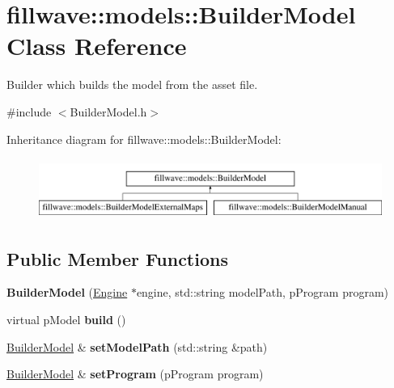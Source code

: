 \hypertarget{classfillwave_1_1models_1_1BuilderModel}{}\section{fillwave\+:\+:models\+:\+:Builder\+Model Class Reference}
\label{classfillwave_1_1models_1_1BuilderModel}


Builder which builds the model from the asset file.  




{\ttfamily \#include $<$Builder\+Model.\+h$>$}

Inheritance diagram for fillwave\+:\+:models\+:\+:Builder\+Model\+:\begin{figure}[H]
\begin{center}
\leavevmode
\includegraphics[height=2.000000cm]{classfillwave_1_1models_1_1BuilderModel}
\end{center}
\end{figure}
\subsection*{Public Member Functions}
\begin{DoxyCompactItemize}
\item 
\hypertarget{classfillwave_1_1models_1_1BuilderModel_ae7ed2ae0486af650bad110f7f9d41b3e}{}{\bfseries Builder\+Model} (\hyperlink{classfillwave_1_1Engine}{Engine} $\ast$engine, std\+::string model\+Path, p\+Program program)\label{classfillwave_1_1models_1_1BuilderModel_ae7ed2ae0486af650bad110f7f9d41b3e}

\item 
\hypertarget{classfillwave_1_1models_1_1BuilderModel_ae1dfaa700dda4f97021a543139194408}{}virtual p\+Model {\bfseries build} ()\label{classfillwave_1_1models_1_1BuilderModel_ae1dfaa700dda4f97021a543139194408}

\item 
\hypertarget{classfillwave_1_1models_1_1BuilderModel_a6f79f1bfa7fa74173e0414562fe9459e}{}\hyperlink{classfillwave_1_1models_1_1BuilderModel}{Builder\+Model} \& {\bfseries set\+Model\+Path} (std\+::string \&path)\label{classfillwave_1_1models_1_1BuilderModel_a6f79f1bfa7fa74173e0414562fe9459e}

\item 
\hypertarget{classfillwave_1_1models_1_1BuilderModel_ae6f0837d2abfdc3de31fcc774104396b}{}\hyperlink{classfillwave_1_1models_1_1BuilderModel}{Builder\+Model} \& {\bfseries set\+Program} (p\+Program program)\label{classfillwave_1_1models_1_1BuilderModel_ae6f0837d2abfdc3de31fcc774104396b}

\end{DoxyCompactItemize}
